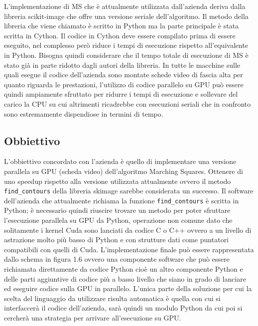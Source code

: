 \documentclass[12pt,a4paper]{report}
\begin{document}
L’implementazione di MS che è attualmente utilizzata dall’azienda deriva dalla libreria scikit-image che offre una versione seriale dell’algoritmo. Il metodo della libreria che viene chiamato è scritto in Python ma la parte principale è stata scritta in Cython.
Il codice in Cython deve essere compilato prima di essere eseguito, nel complesso però riduce i tempi di esecuzione rispetto all’equivalente in Python. Bisogna quindi considerare che il tempo totale di esecuzione di MS è stato già in parte ridotto dagli autori della libreria. \newline
In tutte le macchine sulle quali esegue il codice dell'azienda sono montate schede video di fascia alta per quanto riguarda le prestazioni, l'utilizzo di codice parallelo su GPU può essere quindi ampiamente sfruttato per ridurre i tempi di esecuzione e sollevare del carico la CPU su cui altrimenti ricadrebbe con esecuzioni seriali che in confronto sono estremamente dispendiose in termini di tempo.

\subsection{Obbiettivo}
L'obbiettivo concordato con l'azienda è quello di implementare una versione parallela su GPU (scheda video) dell'algoritmo Marching Squares. Ottenere di uno speedup rispetto alla versione utilizzata attualmente ovvero il metodo \verb|find_contours| della libreria skimage sarebbe considerata un successo. \newline
Il software dell'azienda che attualmente richiama la funzione \verb|find_contours| è scritta in Python; è necessario quindi riuscire trovare un metodo per poter sfruttare l'esecuzione parallela su GPU da Python, operazione non comune dato che solitamente i kernel Cuda sono lanciati da codice C o C++ ovvero a un livello di astrazione molto più basso di Python e con strutture dati come puntatori compatibili con quelli di Cuda. \newline
L'implementazione finale può essere rappresentata dallo schema in figura 1.6 ovvero una componente software che può essere richiamata direttamente da codice Python cioè un altro componente Python e delle parti aggiuntive di codice più a basso livello che siano in grado di lanciare ed eseguire codice sulla GPU in parallelo. L'unica parte della soluzione per cui la scelta del linguaggio da utilizzare risulta automatica è quella con cui si interfaccerà il codice dell'azienda, sarà quindi un modulo Python da cui poi si cercherà una strategia per arrivare all'esecuzione su GPU. \newline
\end{document}
